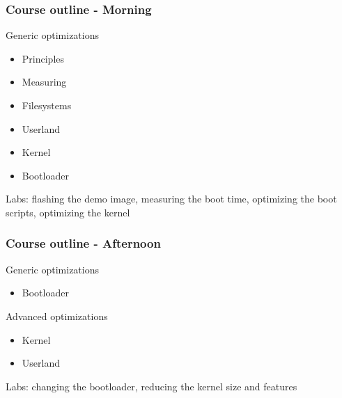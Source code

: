 \begin{frame}
\frametitle{Course outline - Morning}
Generic optimizations
\begin{itemize}
\item Principles
\item Measuring
\item Filesystems
\item Userland
\item Kernel
\item Bootloader
\end{itemize}
Labs: flashing the demo image, measuring the boot time, optimizing the
boot scripts, optimizing the kernel
\end{frame}

\begin{frame}
\frametitle{Course outline - Afternoon}
Generic optimizations
\begin{itemize}
\item Bootloader
\end{itemize}
Advanced optimizations
\begin{itemize}
\item Kernel
\item Userland
\end{itemize}
Labs: changing the bootloader, reducing the kernel size and features
\end{frame}

